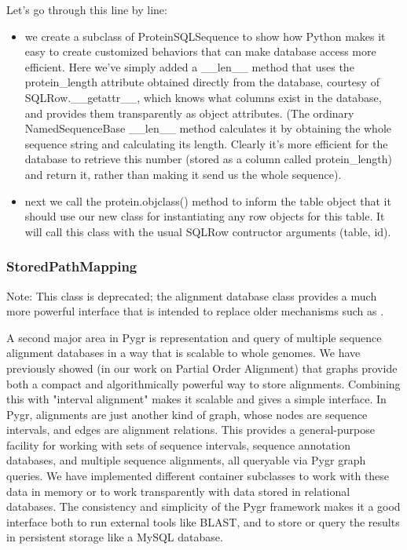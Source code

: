 \documentclass{howto}
\begin{document}
Let's go through this line by line:

\begin{itemize}

\item
we create a subclass of ProteinSQLSequence to show how Python makes it easy to create customized behaviors that can make database access more efficient.  Here we've simply added a __len__ method that uses the protein_length attribute obtained directly from the database, courtesy of SQLRow.__getattr__, which knows what columns exist in the database, and provides them transparently as object attributes.  (The ordinary NamedSequenceBase __len__ method calculates it by obtaining the whole sequence string and calculating its length.  Clearly it's more efficient for the database to retrieve this number (stored as a column called protein_length) and return it, rather than making it send us the whole sequence).

\item
next we call the protein.objclass() method to inform the table object that it should use our new class for instantiating any row objects for this table.  It will call this class with the usual SQLRow contructor arguments (table, id).
\end{itemize}

\subsubsection{StoredPathMapping}

Note: This class is deprecated; the  alignment database class provides
a much more powerful interface that is intended to replace older mechanisms
such as .

A second major area in Pygr is representation and query of multiple sequence alignment databases in a way that is scalable to whole genomes.  We have previously showed (in our work on Partial Order Alignment) that graphs provide both a compact and algorithmically powerful way to store alignments.  Combining this with "interval alignment" makes it scalable and gives a simple interface.  In Pygr, alignments are just another kind of graph, whose nodes are sequence intervals, and edges are alignment relations.  This provides a general-purpose facility for working with sets of sequence intervals, sequence annotation databases, and multiple sequence alignments, all queryable via Pygr graph queries.  We have implemented different container subclasses to work with these data in memory or to work transparently with data stored in relational databases.  The consistency and simplicity of the Pygr framework makes it a good interface both to run external tools like BLAST, and to store or query the results in persistent storage like a MySQL database.
\end{document}
